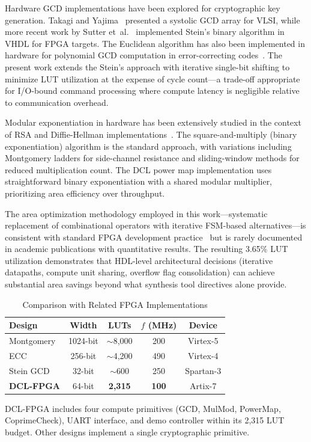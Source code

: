 \documentclass[lettersize,journal]{IEEEtran}
\begin{document}
Hardware GCD implementations have been explored for cryptographic key generation. Takagi and Yajima~\cite{takagi1992} presented a systolic GCD array for VLSI, while more recent work by Sutter et~al.~\cite{sutter2007} implemented Stein's binary algorithm in VHDL for FPGA targets. The Euclidean algorithm has also been implemented in hardware for polynomial GCD computation in error-correcting codes~\cite{cormen2009}. The present work extends the Stein's approach with iterative single-bit shifting to minimize LUT utilization at the expense of cycle count---a trade-off appropriate for I/O-bound command processing where compute latency is negligible relative to communication overhead.

Modular exponentiation in hardware has been extensively studied in the context of RSA and Diffie-Hellman implementations~\cite{menezes1996}. The square-and-multiply (binary exponentiation) algorithm is the standard approach, with variations including Montgomery ladders for side-channel resistance and sliding-window methods for reduced multiplication count. The DCL power map implementation uses straightforward binary exponentiation with a shared modular multiplier, prioritizing area efficiency over throughput.

The area optimization methodology employed in this work---systematic replacement of combinational operators with iterative FSM-based alternatives---is consistent with standard FPGA development practice~\cite{xilinxug901} but is rarely documented in academic publications with quantitative results. The resulting 3.65\% LUT utilization demonstrates that HDL-level architectural decisions (iterative datapaths, compute unit sharing, overflow flag consolidation) can achieve substantial area savings beyond what synthesis tool directives alone provide.

\begin{table}[!t]
\caption{Comparison with Related FPGA Implementations\label{tab:relwork}}
\centering
\begin{tabular}{@{}lcccc@{}}
\toprule
\textbf{Design} & \textbf{Width} & \textbf{LUTs} & \textbf{$f$ (MHz)} & \textbf{Device} \\
\midrule
Montgomery~\cite{tenca2003} & 1024-bit & $\sim$8{,}000 & 200 & Virtex-5 \\
ECC~\cite{guneysu2008}      & 256-bit  & $\sim$4{,}200 & 490 & Virtex-4 \\
Stein GCD~\cite{sutter2007} & 32-bit   & $\sim$600     & 250 & Spartan-3 \\
\textbf{DCL-FPGA}           & 64-bit   & \textbf{2{,}315} & \textbf{100} & Artix-7 \\
\bottomrule
\end{tabular}
\vspace{0.5em}
\footnotesize DCL-FPGA includes four compute primitives (GCD, MulMod, PowerMap, CoprimeCheck), UART interface, and demo controller within its 2{,}315 LUT budget. Other designs implement a single cryptographic primitive.
\end{table}
\end{document}

